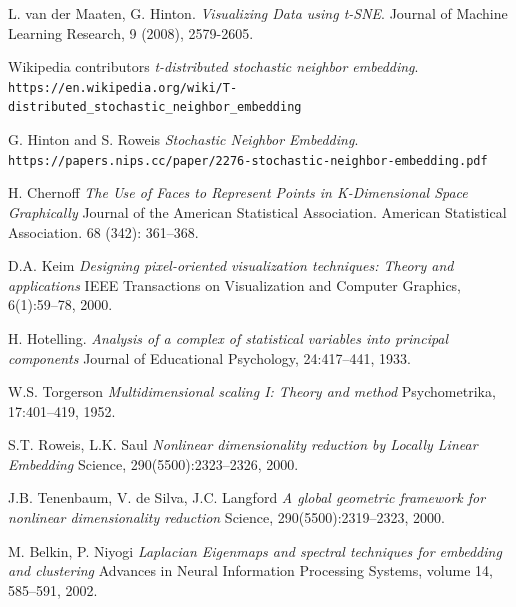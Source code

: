 \begin{thebibliography}{6}
	L. van der Maaten, G. Hinton.
	\textit{Visualizing Data using t-SNE}. 
	Journal of Machine Learning Research, 9 (2008), 2579-2605.
	
	Wikipedia contributors
	\textit{t-distributed stochastic neighbor embedding}. 
	\texttt{https://en.wikipedia.org/wiki/T-distributed\_stochastic\_neighbor\_embedding}
	
	G. Hinton and S. Roweis
	\textit{Stochastic Neighbor Embedding}.
	\texttt{https://papers.nips.cc/paper/2276-stochastic-neighbor-embedding.pdf}
	
	H. Chernoff
	\textit{The Use of Faces to Represent Points in K-Dimensional Space Graphically}
	Journal of the American Statistical Association. American Statistical Association. 68 (342): 361–368.

	D.A. Keim
	\textit{Designing pixel-oriented visualization techniques: Theory and applications}
	IEEE Transactions on Visualization and Computer Graphics, 6(1):59–78, 2000.

	H. Hotelling.
	\textit{Analysis of a complex of statistical variables into principal components}
	Journal of Educational Psychology, 24:417–441, 1933.

	W.S. Torgerson
	\textit{Multidimensional scaling I: Theory and method}
	Psychometrika, 17:401–419, 1952.

	S.T. Roweis, L.K. Saul
	\textit{Nonlinear dimensionality reduction by Locally Linear Embedding}
	Science, 290(5500):2323–2326, 2000.

	J.B. Tenenbaum, V. de Silva, J.C. Langford
	\textit{A global geometric framework for nonlinear dimensionality reduction}
	Science, 290(5500):2319–2323, 2000.

	M. Belkin, P. Niyogi
	\textit{Laplacian Eigenmaps and spectral techniques for embedding and clustering}
	Advances in Neural Information Processing Systems, volume 14, 585–591, 2002.

\end{thebibliography}



